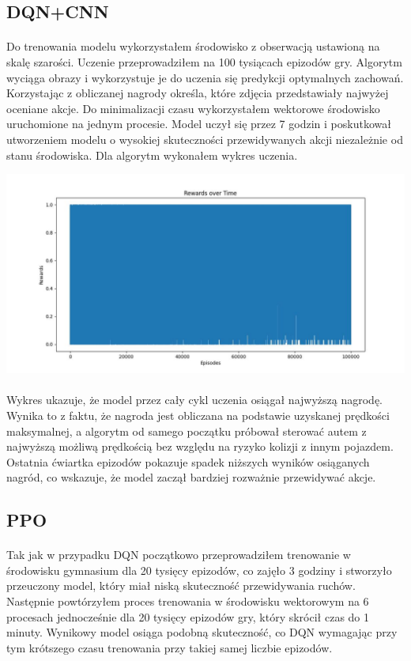 \documentclass{article}
\begin{document}
\subsection{DQN+CNN}
\paragraph{}
Do trenowania modelu wykorzystałem środowisko z obserwacją ustawioną na skalę szarości. Uczenie przeprowadziłem na 100 tysiącach epizodów gry. Algorytm wyciąga obrazy i wykorzystuje je do uczenia się predykcji optymalnych zachowań. Korzystając z obliczanej nagrody określa, które zdjęcia przedstawiały najwyżej oceniane akcje. Do minimalizacji czasu wykorzystałem wektorowe środowisko uruchomione na jednym procesie. Model uczył się przez 7 godzin i poskutkował utworzeniem modelu o wysokiej skuteczności przewidywanych akcji niezależnie od stanu środowiska. Dla algorytm wykonałem wykres uczenia.

\newpage

\includegraphics[width=1\linewidth]{DQN+CNN.jpg}
\paragraph{}
Wykres ukazuje, że model przez cały cykl uczenia osiągał najwyższą nagrodę. Wynika to z faktu, że nagroda jest obliczana na podstawie uzyskanej prędkości maksymalnej, a algorytm od samego początku próbował sterować autem z najwyższą możliwą prędkością bez względu na ryzyko kolizji z innym pojazdem. Ostatnia ćwiartka epizodów pokazuje spadek niższych wyników osiąganych nagród, co wskazuje, że model zaczął bardziej rozważnie przewidywać akcje.


\subsection{PPO}
\paragraph{}
Tak jak w przypadku DQN początkowo przeprowadziłem trenowanie w środowisku gymnasium dla 20 tysięcy epizodów, co zajęło 3 godziny i stworzyło przeuczony model, który miał niską skuteczność przewidywania ruchów. Następnie powtórzyłem proces trenowania w środowisku wektorowym na 6 procesach jednocześnie dla 20 tysięcy epizodów gry, który skrócił czas do 1 minuty. Wynikowy model osiąga podobną skuteczność, co DQN wymagając przy tym krótszego czasu trenowania przy takiej samej liczbie epizodów.
\end{document}
